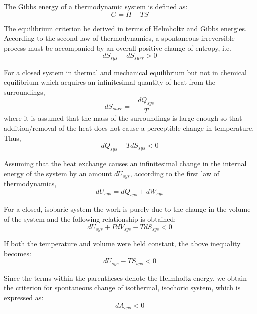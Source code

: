 		The Gibbs energy of a thermodynamic system is defined as:
		\begin{equation}
			G = H - TS
		\end{equation}

		The equilibrium criterion be derived in terms of Helmholtz and Gibbs energies. According to the second law of thermodynamics, a spontaneous irreversible process must be accompanied by an overall positive change of entropy, i.e.
		\begin{equation}
			dS_{sys} + dS_{surr} > 0
		\end{equation}

		For a closed system in thermal and mechanical equilibrium but not in chemical equilibrium which acquires an infinitesimal quantity of heat from the surroundings,
		\begin{equation}
			dS_{surr} = -\frac{dQ_{sys}}{T}
		\end{equation}
		where it is assumed that the mass of the surroundings is large enough so that addition/removal of the heat does not cause a perceptible change in temperature. Thus,
		\begin{equation}
			{dQ_{sys}} - T dS_{sys}  < 0
		\end{equation}

		Assuming that the heat exchange causes an infinitesimal change in the internal energy of the system by an amount $dU_{sys}$, according to the first law of thermodynamics,
		\begin{equation}
			{dU_{sys}} = {dQ_{sys}} + {dW_{sys}}
		\end{equation}

		For a closed, isobaric system the work is purely due to the change in the volume of the system and the following relationship is obtained:
		\begin{equation}
			{dU_{sys}} + P{dV_{sys}} - T{dS_{sys}} < 0
		\end{equation}

		If both the temperature and volume were held constant, the above inequality becomes:
		\begin{equation}
			d{U_{sys} - TS_{sys} } < 0
		\end{equation}

		Since the terms within the parentheses denote the Helmholtz energy, we obtain the criterion for spontaneous change of isothermal, isochoric system, which is expressed as:
		\begin{equation}
			d{A_{sys} } < 0
		\end{equation}


